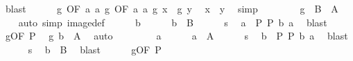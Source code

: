 \begin{isabellebody}
\ blast\isanewline
\ \ \ \ \isamarkupfalse%
\ g\ {\isacharbrackleft}{\kern0pt}OF\ a{}{\isacharbrackright}{\kern0pt}\ a{}\ g\ {\isacharbrackleft}{\kern0pt}OF\ a{}{\isacharbrackright}{\kern0pt}\ a{}\ {\isacartoucheopen}{\isacharquery}{\kern0pt}g\ x\ {\isacharequal}{\kern0pt}\ {\isacharquery}{\kern0pt}g\ y{\isacartoucheclose}\ \isamarkupfalse%
\ {\isachardoublequoteopen}x\ {\isacharequal}{\kern0pt}\ y{\isachardoublequoteclose}\ \isamarkupfalse%
\ simp\isanewline
\ \ \isamarkupfalse%
\isanewline
\ \ \isamarkupfalse%
\ \isamarkupfalse%
\ {\isachardoublequoteopen}{\isacharquery}{\kern0pt}g\ {\isacharbackquote}{\kern0pt}\ B\ {\isacharequal}{\kern0pt}\ A{\isachardoublequoteclose}\isanewline
\ \ \isamarkupfalse%
\ {\isacharparenleft}{\kern0pt}auto\ simp{\isacharcolon}{\kern0pt}\ image{\isacharunderscore}{\kern0pt}def{\isacharparenright}{\kern0pt}\isanewline
\ \ \ \ \isamarkupfalse%
\ b\isanewline
\ \ \ \ \isamarkupfalse%
\ {\isachardoublequoteopen}b\ {\isasymin}\ B{\isachardoublequoteclose}\isanewline
\ \ \ \ \isamarkupfalse%
\ s\ \isamarkupfalse%
\ a\ \ P{\isacharcolon}{\kern0pt}\ {\isachardoublequoteopen}{\isacharquery}{\kern0pt}P\ b\ a{\isachardoublequoteclose}\ \isamarkupfalse%
\ blast\isanewline
\ \ \ \ \isamarkupfalse%
\ g{\isacharbrackleft}{\kern0pt}OF\ P{\isacharbrackright}{\kern0pt}\ \isamarkupfalse%
\ {\isachardoublequoteopen}{\isacharquery}{\kern0pt}g\ b\ {\isasymin}\ A{\isachardoublequoteclose}\ \isamarkupfalse%
\ auto\isanewline
\ \ \isamarkupfalse%
\isanewline
\ \ \ \ \isamarkupfalse%
\ a\isanewline
\ \ \ \ \isamarkupfalse%
\ {\isachardoublequoteopen}a\ {\isasymin}\ A{\isachardoublequoteclose}\isanewline
\ \ \ \ \isamarkupfalse%
\ s\ \isamarkupfalse%
\ b\ \ P{\isacharcolon}{\kern0pt}\ {\isachardoublequoteopen}{\isacharquery}{\kern0pt}P\ b\ a{\isachardoublequoteclose}\ \isamarkupfalse%
\ blast\isanewline
\ \ \ \ \isamarkupfalse%
\ s\ \isamarkupfalse%
\ {\isachardoublequoteopen}b\ {\isasymin}\ B{\isachardoublequoteclose}\ \isamarkupfalse%
\ blast\isanewline
\ \ \ \ \isamarkupfalse%
\ g{\isacharbrackleft}{\kern0pt}OF\ P{\isacharbrackright}{\kern0pt}\ \isamarkupfalse%

\end{isabellebody}
